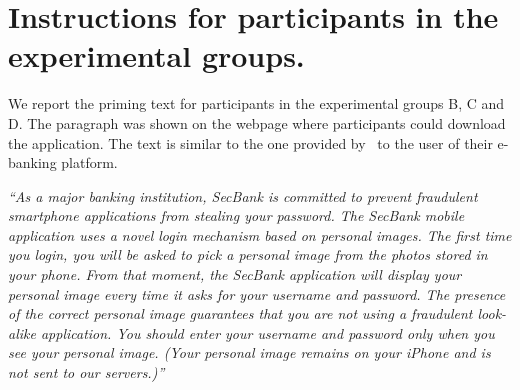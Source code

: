 \section{Instructions for participants in the experimental groups.}
\label{app:sp_phishing_priming}

We report the priming text for participants in the experimental groups B, C and D. The paragraph was shown on the webpage where participants could download the application. The text is similar to the one provided by~\cite{boa,vanguard} to the user of their e-banking platform.

\emph{``As a major banking institution, SecBank is committed to prevent fraudulent smartphone applications from stealing your password. The SecBank mobile application uses a novel login mechanism based on personal images. The first time you login, you will be asked to pick a personal image from the photos stored in your phone. From that moment, the SecBank application will display your personal image every time it asks for your username and password. The presence of the correct personal image guarantees that you are not using a fraudulent look-alike application. You should enter your username and password only when you see your personal image. (Your personal image remains on your iPhone and is not sent to our servers.)''}

%

